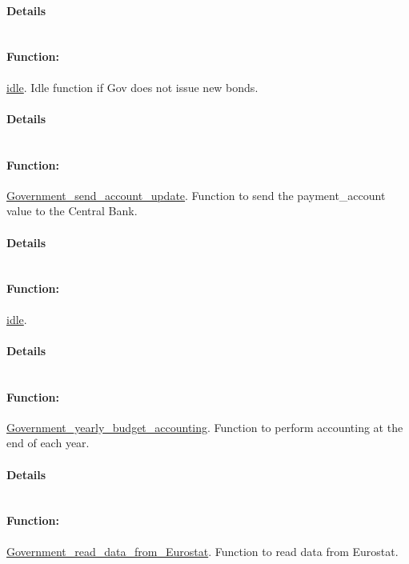 \documentclass[a4paper,11pt]{article}
\begin{document}
\paragraph{Details}
\begin{verbatim}
\end{verbatim}
\paragraph{Function:}\url{idle}.
Idle function if Gov does not issue new bonds.
\paragraph{Details}
\begin{verbatim}
\end{verbatim}
\paragraph{Function:}\url{Government_send_account_update}.
Function to send the payment\_account value to the Central Bank.
\paragraph{Details}
\begin{verbatim}
\end{verbatim}
\paragraph{Function:}\url{idle}.

\paragraph{Details}
\begin{verbatim}
\end{verbatim}
\paragraph{Function:}\url{Government_yearly_budget_accounting}.
Function to perform accounting at the end of each year.
\paragraph{Details}
\begin{verbatim}
\end{verbatim}
\paragraph{Function:}\url{Government_read_data_from_Eurostat}.
Function to read data from Eurostat.
\end{document}
